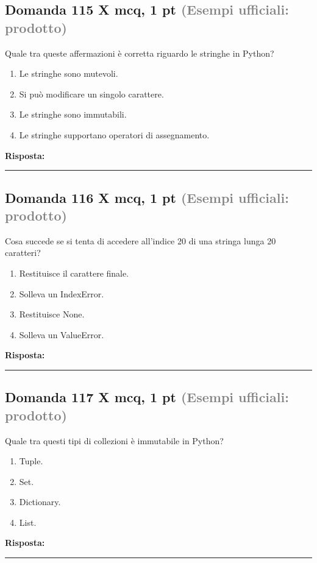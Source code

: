 \documentclass[a4paper,11pt]{article}
\begin{document}
\subsection*{Domanda 115 X \hfill {\small mcq, 1 pt \textcolor{gray}{(Esempi ufficiali: prodotto)}}}
Quale tra queste affermazioni è corretta riguardo le stringhe in Python?

\begin{enumerate}[label=\alph*)]
\item Le stringhe sono mutevoli.
\item Si può modificare un singolo carattere.
\item Le stringhe sono immutabili.
\item Le stringhe supportano operatori di assegnamento.
\end{enumerate}
\vspace{0.2cm}
\noindent\textbf{Risposta:}\par
\vspace{1.5cm}\hrule


\subsection*{Domanda 116 X \hfill {\small mcq, 1 pt \textcolor{gray}{(Esempi ufficiali: prodotto)}}}
Cosa succede se si tenta di accedere all'indice 20 di una stringa lunga 20 caratteri?

\begin{enumerate}[label=\alph*)]
\item Restituisce il carattere finale.
\item Solleva un IndexError.
\item Restituisce None.
\item Solleva un ValueError.
\end{enumerate}
\vspace{0.2cm}
\noindent\textbf{Risposta:}\par
\vspace{1.5cm}\hrule


\subsection*{Domanda 117 X \hfill {\small mcq, 1 pt \textcolor{gray}{(Esempi ufficiali: prodotto)}}}
Quale tra questi tipi di collezioni è immutabile in Python?

\begin{enumerate}[label=\alph*)]
\item Tuple.
\item Set.
\item Dictionary.
\item List.
\end{enumerate}
\vspace{0.2cm}
\noindent\textbf{Risposta:}\par
\vspace{1.5cm}\hrule
\end{document}
